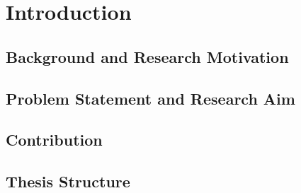 \chapter{Introduction}
\label{ch-introduction}



\section{Background and Research Motivation}

\section{Problem Statement and Research Aim}

\section{Contribution}



\section{Thesis Structure}

